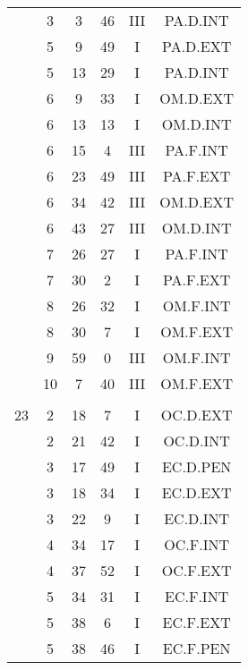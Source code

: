 \documentclass[12pt, a4paper]{article}
\begin{document}
\begin{multicols}{3}
{\begin{tabular}{c c c c c c}
	 	 	 	 & 3 & 3 & 46 & III & PA.D.INT\\%
	 	 	 	 & 5 & 9 & 49 & I & PA.D.EXT\\%
	 	 	 	 & 5 & 13 & 29 & I & PA.D.INT\\%
	 	 	 	 & 6 & 9 & 33 & I & OM.D.EXT\\%
	 	 	 	 & 6 & 13 & 13 & I & OM.D.INT\\%
	 	 	 	 & 6 & 15 & 4 & III & PA.F.INT\\%
	 	 	 	 & 6 & 23 & 49 & III & PA.F.EXT\\%
	 	 	 	 & 6 & 34 & 42 & III & OM.D.EXT\\%
	 	 	 	 & 6 & 43 & 27 & III & OM.D.INT\\%
	 	 	 	 & 7 & 26 & 27 & I & PA.F.INT\\%
	 	 	 	 & 7 & 30 & 2 & I & PA.F.EXT\\%
	 	 	 	 & 8 & 26 & 32 & I & OM.F.INT\\%
	 	 	 	 & 8 & 30 & 7 & I & OM.F.EXT\\%
	 	 	 	 & 9 & 59 & 0 & III & OM.F.INT\\%
	 	 	 	 & 10 & 7 & 40 & III & OM.F.EXT\\%
	 	 	 	 & & & & & \\%
	 	 	 	23 & 2 & 18 & 7 & I & OC.D.EXT\\%
	 	 	 	 & 2 & 21 & 42 & I & OC.D.INT\\%
	 	 	 	 & 3 & 17 & 49 & I & EC.D.PEN\\%
	 	 	 	 & 3 & 18 & 34 & I & EC.D.EXT\\%
	 	 	 	 & 3 & 22 & 9 & I & EC.D.INT\\%
	 	 	 	 & 4 & 34 & 17 & I & OC.F.INT\\%
	 	 	 	 & 4 & 37 & 52 & I & OC.F.EXT\\%
	 	 	 	 & 5 & 34 & 31 & I & EC.F.INT\\%
	 	 	 	 & 5 & 38 & 6 & I & EC.F.EXT\\%
	 	 	 	 & 5 & 38 & 46 & I & EC.F.PEN\\%
	 	 \end{tabular}
 	}
\end{multicols}
\end{document}

